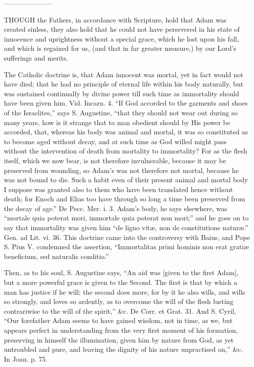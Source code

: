 
———————


THOUGH
the Fathers, in accordance with Scripture, hold that Adam was created
sinless, they also hold that he could not have persevered in his state
of innocence and uprightness without a special grace, which he lost
upon his fall, and which is regained for us, (and that in far greater
measure,) by our Lord's sufferings and merits.

The Catholic doctrine is, that Adam innocent was
mortal, yet in fact would not have died; that he had no principle of
eternal life within his body naturally, but was sustained continually
by divine power till such time as immortality should have been given
him. Vid. Incarn. 4. ``If God accorded to the garments and shoes of the
Israelites,'' says S. Augustine, ``that they should not wear out during
so many years, how is it strange that to man obedient should by His
power be accorded, that, whereas his body was animal and mortal, it
was so constituted as to become aged without decay, and at such time
as God willed might pass without the intervention of death from
mortality to immortality? For as the flesh itself, which we now
bear, is not therefore invulnerable, because it may be preserved from
wounding, so Adam's was not therefore not mortal, because he was not
bound to die. Such a habit even of their present animal and mortal
body I suppose was granted also to them who have been translated hence
without death; for Enoch and Elias too have through so long a time
been preserved from the decay of age.'' De Pecc. Mer. i. 3. Adam's
body, he says elsewhere, was ``mortale quia poterat mori, immortale
quia poterat non mori;'' and he goes on to say that immortality was
given him ``de ligno vitæ, non de constitutione naturæ.'' Gen. ad Lit.
vi. 36. This doctrine came into the controversy with Baius, and Pope
S. Pius V. condemned the assertion, ``Immortalitas primi hominis non
erat gratiæ beneficium, sed naturalis conditio.''

Then, as to his soul, S. Augustine says, ``An aid
was [given to the first Adam], but a more powerful grace is given to
the Second. The first is that by which a man has justice if he will;
the second does more, for by it he also wills, and wills so strongly,
and loves so ardently, as to overcome the will of the flesh lusting
contrariwise to the will of the spirit,'' \&c. De Corr. et Grat. 31.
And S. Cyril, ``Our forefather Adam seems to have gained wisdom, not in
time, as we, but appears perfect in understanding from the very first
moment of his formation, preserving in himself the illumination, given
him by nature from God, as yet untroubled and pure, and leaving the
dignity of his nature unpractised on,'' \&c. In Joan. p. 75.

